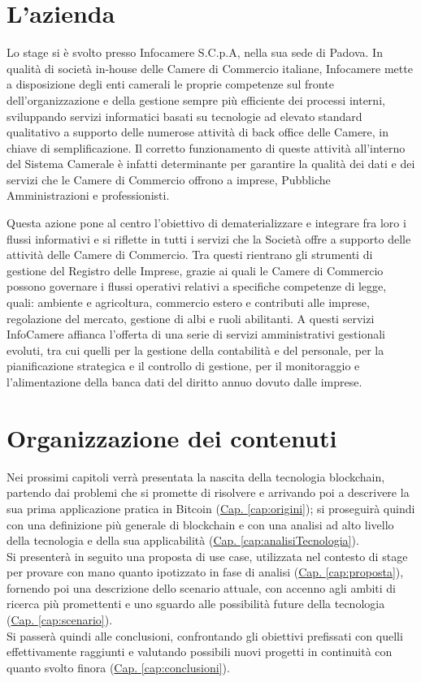 \section{L'azienda}
	Lo stage si è svolto presso Infocamere S.C.p.A, nella sua sede di Padova.
	In qualità di società in-house delle Camere di Commercio italiane, Infocamere mette a disposizione degli enti camerali le proprie competenze sul fronte dell’organizzazione e della gestione sempre più efficiente dei processi interni, sviluppando servizi informatici basati su tecnologie ad elevato standard qualitativo a supporto delle numerose attività di back office delle Camere, in chiave di semplificazione. Il corretto funzionamento di queste attività all'interno del Sistema Camerale è infatti determinante per garantire la qualità dei dati e dei servizi che le Camere di Commercio offrono a imprese, Pubbliche Amministrazioni e professionisti.
	
	Questa azione pone al centro l’obiettivo di dematerializzare e integrare fra loro i flussi informativi e si riflette in tutti i servizi che la Società offre a supporto delle attività delle Camere di Commercio. Tra questi rientrano gli strumenti di gestione del Registro delle Imprese, grazie ai quali le Camere di Commercio possono governare i flussi operativi relativi a specifiche competenze di legge, quali: ambiente e agricoltura, commercio estero e contributi alle imprese, regolazione del mercato, gestione di albi e ruoli abilitanti. A questi servizi InfoCamere affianca l’offerta di una serie di servizi amministrativi gestionali evoluti, tra cui quelli per la gestione della contabilità e del personale, per la pianificazione strategica e il controllo di gestione, per il monitoraggio e l'alimentazione della banca dati del diritto annuo dovuto dalle imprese.

\section{Organizzazione dei contenuti}
	Nei prossimi capitoli verrà presentata la nascita della tecnologia blockchain, partendo dai problemi che si promette di risolvere e arrivando poi a descrivere la sua prima applicazione pratica in Bitcoin (\hyperref[cap:origini]{Cap. \ref*{cap:origini}}); si proseguirà quindi con una definizione più generale di blockchain e con una analisi ad alto livello della tecnologia e della sua applicabilità (\hyperref[cap:analisiTecnologia]{Cap. \ref*{cap:analisiTecnologia}}). \\
	Si presenterà in seguito una proposta di use case, utilizzata nel contesto di stage per provare con mano quanto ipotizzato in fase di analisi (\hyperref[cap:proposta]{Cap. \ref*{cap:proposta}}), fornendo poi una descrizione dello scenario attuale, con accenno agli ambiti di ricerca più promettenti e uno sguardo alle possibilità future della tecnologia (\hyperref[cap:scenario]{Cap. \ref*{cap:scenario}}). \\
	Si passerà quindi alle conclusioni, confrontando gli obiettivi prefissati con quelli effettivamente raggiunti e valutando possibili nuovi progetti in continuità con quanto svolto finora (\hyperref[cap:conclusioni]{Cap. \ref*{cap:conclusioni}}).